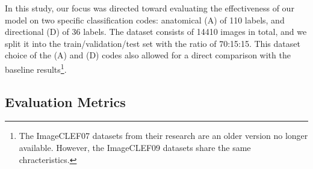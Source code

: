 \documentclass[wcp]{jmlr}
\begin{document}
In this study, our focus was directed toward evaluating the effectiveness of our model on two specific classification codes: anatomical (A) of 110 labels, and directional (D) of 36 labels. The dataset consists of 14410 images in total, and we split it into the train/validation/test set with the ratio of 70:15:15.
This dataset choice of the (A) and (D) codes also allowed for a direct comparison with the baseline results\footnote{The ImageCLEF07 datasets from their research are an older version no longer available. However, the ImageCLEF09 datasets share the same chracteristics.}. 



\subsection{Evaluation Metrics}\label{sec:metric}
\end{document}
